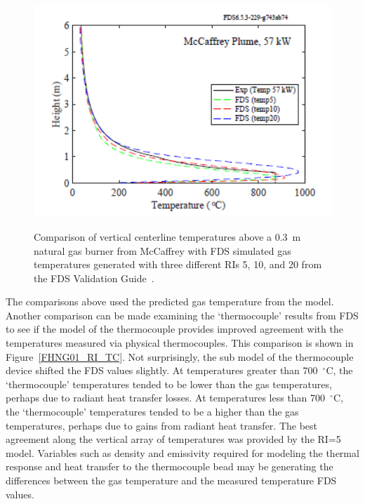 \documentclass[twoside]{uocthesis}
\begin{document}
{\begin{figure}[h]
	\includegraphics[width=5in] {../Figures/McCaffrey_Plume_comp}  \\
	\caption[Comparison of vertical centerline temperatures above a 0.3~m natural gas burner from McCaffrey with FDS simulated gas temperatures.] {Comparison of vertical centerline temperatures above a 0.3~m natural gas burner from McCaffrey with FDS simulated gas temperatures generated with three different RIs 5, 10, and 20 from the FDS Validation Guide~\cite{FDS_Validation_Guide}.}
	\label{McCaffrey_Plume_comp}
\end{figure}

The comparisons above used the predicted gas temperature from the model. Another comparison can be made examining the `thermocouple' results from FDS to see if the model of the thermocouple provides improved agreement with the temperatures measured via physical thermocouples.  This comparison is shown in Figure~\ref{FHNG01_RI_TC}.  Not surprisingly, the sub model of the thermocouple device shifted the FDS values slightly.  At temperatures greater than 700~$^\circ$C, the `thermocouple' temperatures tended to be lower than the gas temperatures, perhaps due to radiant heat transfer losses. At temperatures less than 700~$^\circ$C, the `thermocouple' temperatures tended to be a higher than the gas temperatures, perhaps due to gains from radiant heat transfer.  The best agreement along the vertical array of temperatures was provided by the RI=5 model.  Variables such as density and emissivity required for modeling the thermal response and heat transfer to the thermocouple bead may be generating the differences between the gas temperature and the measured temperature FDS values.  

}
\end{document}
